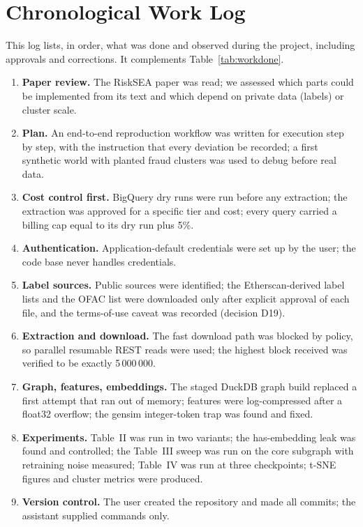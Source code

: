 \chapter{Chronological Work Log}
\label{app:log}
This log lists, in order, what was done and observed during the project, including approvals and corrections. It complements Table~\ref{tab:workdone}.
\begin{enumerate}[label=\arabic*.]
\item \textbf{Paper review.} The RiskSEA paper was read; we assessed which parts could be implemented from its text and which depend on private data (labels) or cluster scale.
\item \textbf{Plan.} An end-to-end reproduction workflow was written for execution step by step, with the instruction that every deviation be recorded; a first synthetic world with planted fraud clusters was used to debug before real data.
\item \textbf{Cost control first.} BigQuery dry runs were run before any extraction; the extraction was approved for a specific tier and cost; every query carried a billing cap equal to its dry run plus 5\%.
\item \textbf{Authentication.} Application-default credentials were set up by the user; the code base never handles credentials.
\item \textbf{Label sources.} Public sources were identified; the Etherscan-derived label lists and the OFAC list were downloaded only after explicit approval of each file, and the terms-of-use caveat was recorded (decision D19).
\item \textbf{Extraction and download.} The fast download path was blocked by policy, so parallel resumable REST reads were used; the highest block received was verified to be exactly 5\,000\,000.
\item \textbf{Graph, features, embeddings.} The staged DuckDB graph build replaced a first attempt that ran out of memory; features were log-compressed after a float32 overflow; the gensim integer-token trap was found and fixed.
\item \textbf{Experiments.} Table~II was run in two variants; the has-embedding leak was found and controlled; the Table~III sweep was run on the core subgraph with retraining noise measured; Table~IV was run at three checkpoints; t-SNE figures and cluster metrics were produced.
\item \textbf{Version control.} The user created the repository and made all commits; the assistant supplied commands only.

\end{enumerate}
